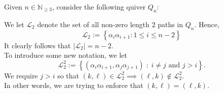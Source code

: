 \documentclass{article}
\renewcommand{\L}{\mathcal{L}}
\begin{document}
\begin{flushleft}
Given $n \in \mathbb{N}_{\geq 3}$, consider the following quiver $Q_n$:
\begin{center}
\end{center}
We let $\mathcal{L}_2$ denote the set of all non-zero length $2$ paths in $Q_n$. Hence,
\[
\mathcal{L}_2 := \left\{\alpha_i \alpha_{i+1} : 1 \leq i \leq n-2\right\}
\]
It clearly follows that $\left|\L_2\right| = n-2.$ \\[\baselineskip]

To introduce some new notation, we let 
\[\L_2^2 := \left\{(\alpha_i\alpha_{i+1}, \alpha_j\alpha_{j+1}) \; : \; i \neq j \text{ and } j > i\right\}.
\]
We require $j > i$ so that $(k, \ell) \in \L_2^2 \implies (\ell, k) \not\in \L_2^2$. \\
In other words, we are trying to enforce that $(k, \ell) = (\ell, k)$. \\[\baselineskip]


\end{flushleft}
\end{document}
